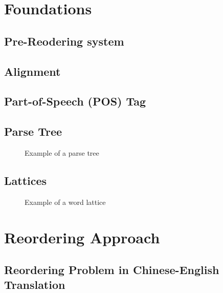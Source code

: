 
\chapter{Foundations}
\label{ch:Foundations}

\section{Pre-Reodering system}
\label{ch:Foundations:sec:PreReorderingSystem}

\section{Alignment}
\label{ch:Foundations:sec:Alignment}

\section{Part-of-Speech (POS) Tag}
\label{ch:Foundations:sec:PosTag}

\section{Parse Tree}
\label{ch:Foundations:sec:ParseTree}

\begin{figure}[H]
\centering

\caption{Example of a parse tree}
\end{figure}


\section{Lattices}
\label{ch:Foundations:sec:Lattices}
\begin{landscape}
\begin{figure}
\centering

\caption{Example of a word lattice}
\end{figure}
\end{landscape}

\chapter{Reordering Approach}
\label{ch:ReorderingApproach}

\section{Reordering Problem in Chinese-English Translation}
\label{ch:ReorderingApproach:sec:Problem}
